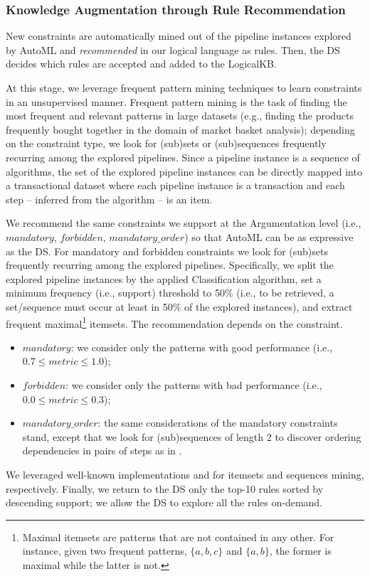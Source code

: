 \subsubsection{Knowledge Augmentation through Rule Recommendation}

New constraints are automatically mined out of the pipeline instances explored by AutoML and \emph{recommended} in our logical language as rules.
Then, the DS decides which rules are accepted and added to the LogicalKB.


At this stage, we leverage frequent pattern mining techniques to learn constraints in an unsupervised manner.
Frequent pattern mining is the task of finding the most frequent and relevant patterns in large datasets (e.g., finding the products frequently bought together in the domain of market basket analysis); depending on the constraint type, we look for (sub)sets \cite{srikant1995mining} or (sub)sequences \cite{srikant1996mining} frequently recurring among the explored pipelines.
Since a pipeline instance is a sequence of algorithms, the set of the explored pipeline instances can be directly mapped into a transactional dataset \cite{srikant1995mining} where each pipeline instance is a transaction and each step -- inferred from the algorithm -- is an item.

We recommend the same constraints we support at the Argumentation level (i.e., $mandatory$, $forbidden$, $mandatory\_order$) so that AutoML can be as expressive as the DS.
For mandatory and forbidden constraints we look for (sub)sets \cite{srikant1995mining} frequently recurring among the explored pipelines.
Specifically, we split the explored pipeline instances by the applied Classification algorithm, set a minimum frequency (i.e., support) threshold to 50\% (i.e., to be retrieved, a set/sequence must occur at least in 50\% of the explored instances), and extract frequent maximal\footnote{Maximal itemsets are patterns that are not contained in any other.
For instance, given two frequent patterns, $\{a, b, c\}$ and $\{a, b\}$, the former is maximal while the latter is not.
}
itemsets.
The recommendation depends on the constraint.
\begin{itemize}
    \item $mandatory$: we consider only the patterns with good performance (i.e., $0.7 \leq metric \leq 1.0$); 
    \item $forbidden$: we consider only the patterns with bad performance (i.e., $0.0 \leq metric \leq 0.3$);
    \item $mandatory\_order$: the same considerations of the mandatory constraints stand, except that we look for (sub)sequences \cite{srikant1996mining} of length 2 to discover ordering dependencies in pairs of steps as in \cite{giovanelli2021data}.   
\end{itemize}
We leveraged well-known implementations \cite{raschkas_2018_mlxtend} and \cite{seq2pat2022} for itemsets and sequences mining, respectively.
Finally, we return to the DS only the top-10 rules sorted by descending support; we allow the DS to explore all the rules on-demand.

